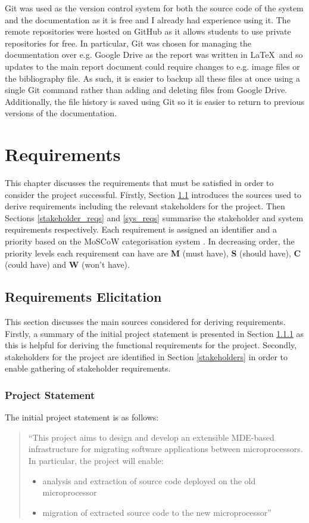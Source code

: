 \documentclass{UoYCSproject}
\begin{document}
Git was used as the version control system for both the source code of the system and the documentation as it is free and I already had experience using it. The remote repositories were hosted on GitHub as it allows students to use private repositories for free. In particular, Git was chosen for managing the documentation over e.g. Google Drive as the report was written in \LaTeX~and so updates to the main report document could require changes to e.g. image files or the bibliography file. As such, it is easier to backup all these files at once using a single Git command rather than adding and deleting files from Google Drive. Additionally, the file history is saved using Git so it is easier to return to previous versions of the documentation.

\chapter{Requirements} \label{reqs}
This chapter discusses the requirements that must be satisfied in order to consider the project successful. Firstly, Section \ref{req_gathering} introduces the sources used to derive requirements including the relevant stakeholders for the project. Then Sections \ref{stakeholder_reqs} and \ref{sys_reqs} summarise the stakeholder and system requirements respectively. Each requirement is assigned an identifier and a priority based on the MoSCoW categorisation system \parencite{moscow}. In decreasing order, the priority levels each requirement can have are \textbf{M} (must have), \textbf{S} (should have), \textbf{C} (could have) and \textbf{W} (won't have).

\section{Requirements Elicitation} \label{req_gathering}
This section discusses the main sources considered for deriving requirements. Firstly, a summary of the initial project statement is presented in Section \ref{proj_stmt} as this is helpful for deriving the functional requirements for the project. Secondly, stakeholders for the project are identified in Section \ref{stakeholders} in order to enable gathering of stakeholder requirements.

\subsection{Project Statement} \label{proj_stmt}
The initial project statement is as follows: 
\begin{quote}
``This project aims to design and develop an extensible MDE-based infrastructure for migrating software applications between microprocessors. In particular, the project will enable:
\begin{itemize}
\item analysis and extraction of source code deployed on the old microprocessor
\item migration of extracted source code to the new microprocessor''
\end{itemize}
\end{quote}
\end{document}
